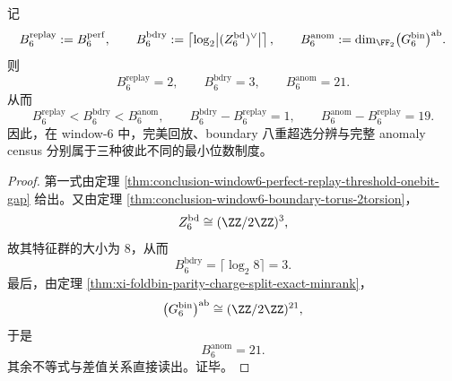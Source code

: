 \begin{corollary}\label{cor:conclusion-window6-replay-boundary-anomaly-bit-separation}
记
\[
B_6^{\mathrm{replay}}:=B_6^{\mathrm{perf}},
\qquad
B_6^{\mathrm{bdry}}
:=
\left\lceil \log_2 \bigl|(Z_6^{\mathrm{bd}})^\vee\bigr|\right\rceil,
\qquad
B_6^{\mathrm{anom}}
:=
\dim_{\FF_2}\bigl(G_6^{\mathrm{bin}}\bigr)^{\mathrm{ab}}.
\]
则
\[
B_6^{\mathrm{replay}}=2,
\qquad
B_6^{\mathrm{bdry}}=3,
\qquad
B_6^{\mathrm{anom}}=21.
\]
从而
\[
B_6^{\mathrm{replay}}
<
B_6^{\mathrm{bdry}}
<
B_6^{\mathrm{anom}},
\qquad
B_6^{\mathrm{bdry}}-B_6^{\mathrm{replay}}=1,
\qquad
B_6^{\mathrm{anom}}-B_6^{\mathrm{replay}}=19.
\]
因此，在 window-\(6\) 中，完美回放、boundary 八重超选分辨与完整 anomaly census 分别属于三种彼此不同的最小位数制度。
\end{corollary}
\begin{proof}
第一式由定理 \ref{thm:conclusion-window6-perfect-replay-threshold-onebit-gap} 给出。又由定理 \ref{thm:conclusion-window6-boundary-torus-2torsion}，
\[
Z_6^{\mathrm{bd}}\cong (\ZZ/2\ZZ)^3,
\]
故其特征群的大小为 \(8\)，从而
\[
B_6^{\mathrm{bdry}}=\lceil \log_2 8\rceil=3.
\]
最后，由定理 \ref{thm:xi-foldbin-parity-charge-split-exact-minrank}，
\[
\bigl(G_6^{\mathrm{bin}}\bigr)^{\mathrm{ab}}\cong (\ZZ/2\ZZ)^{21},
\]
于是
\[
B_6^{\mathrm{anom}}=21.
\]
其余不等式与差值关系直接读出。证毕。
\end{proof}

